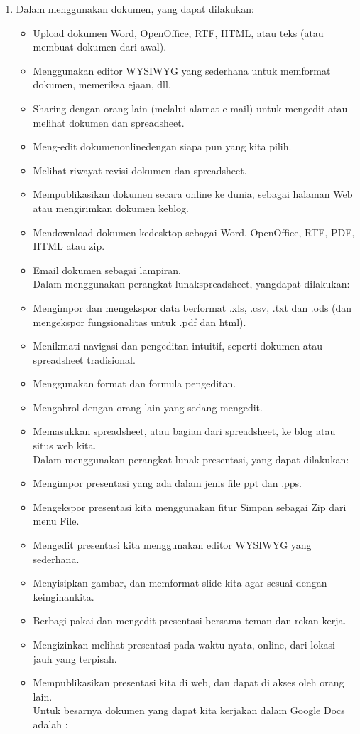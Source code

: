 \begin{enumerate}
\item Dalam menggunakan dokumen, yang dapat dilakukan:
\begin{itemize}
\item Upload dokumen Word, OpenOffice, RTF, HTML, atau teks (atau membuat dokumen dari awal).
\item Menggunakan editor WYSIWYG yang sederhana untuk memformat dokumen, memeriksa ejaan, dll.
\item Sharing dengan orang lain (melalui alamat e-mail) untuk mengedit atau melihat dokumen dan spreadsheet.
\item Meng-edit dokumenonlinedengan siapa pun yang kita pilih.
\item Melihat riwayat revisi dokumen dan spreadsheet.
\item Mempublikasikan dokumen secara online ke dunia, sebagai halaman Web atau mengirimkan dokumen keblog.
\item Mendownload dokumen kedesktop sebagai Word, OpenOffice, RTF, PDF, HTML atau zip.
\item Email dokumen sebagai lampiran. \\Dalam menggunakan perangkat lunakspreadsheet, yangdapat dilakukan:
\end{itemize}
\begin{itemize}
\item Mengimpor dan mengekspor data berformat .xls, .csv, .txt dan .ods (dan mengekspor fungsionalitas untuk .pdf dan html).
\item Menikmati navigasi dan pengeditan intuitif, seperti dokumen atau spreadsheet tradisional.
\item Menggunakan format dan formula pengeditan.
\item Mengobrol dengan orang lain yang sedang mengedit.
\item Memasukkan spreadsheet, atau bagian dari spreadsheet, ke blog atau situs web kita. \\Dalam menggunakan perangkat lunak presentasi, yang dapat dilakukan:
\end{itemize}
\begin{itemize}
\item Mengimpor presentasi yang ada dalam jenis file ppt dan .pps.
\item Mengekspor presentasi kita menggunakan fitur Simpan sebagai Zip dari menu File.
\item Mengedit presentasi kita menggunakan editor WYSIWYG yang sederhana.
\item Menyisipkan gambar, dan memformat slide kita agar sesuai dengan keinginankita.
\item Berbagi-pakai dan mengedit presentasi bersama teman dan rekan kerja.
\item Mengizinkan melihat presentasi pada waktu-nyata, online, dari lokasi jauh yang terpisah.
\item Mempublikasikan presentasi kita di web, dan dapat di akses oleh orang lain. \\Untuk besarnya dokumen yang dapat kita kerjakan dalam Google Docs adalah :
\end{itemize}
\end{enumerate}
